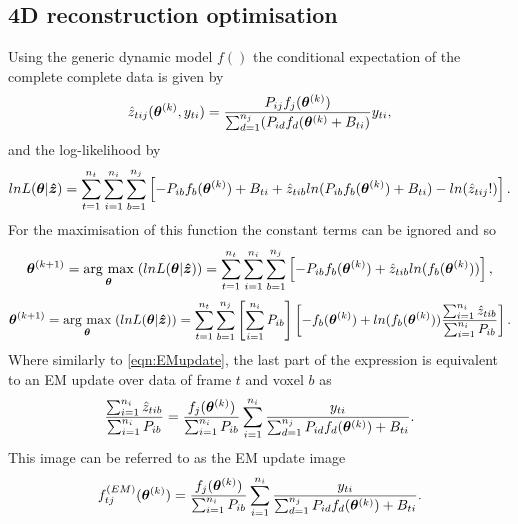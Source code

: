 \subsection{4D reconstruction optimisation}
Using the generic dynamic model $f()$ the conditional expectation of the complete complete data is given by 
\begin{equation}
\hat{z}_{tij}(\bm{\theta}^{(k)},y_{ti}) = 
\frac{P_{ij} f_j(\bm\theta^{(k)})}
{\sum_{d=1}^{n_j} (P_{id} f_d(\bm\theta^{(k)} + B_{ti})}y_{ti}\\,
\end{equation}
and the log-likelihood by
\begin{equation}
lnL(\bm{\theta}|\bm{\hat{z}})  =
\sum_{t=1}^{n_t} \sum_{i=1}^{n_i} \sum_{b=1}^{n_j} 
\left[ -P_{ib} f_b(\bm\theta^{(k)}) + B_{ti} + 
\hat{z}_{tib} ln( P_{ib}  f_b(\bm\theta^{(k)}) + B_{ti} ) -
ln(\hat{z}_{tij}!) \right] \\.
\end{equation}
For the maximisation of this function the constant terms can be ignored and so 
\begin{equation}
\bm{\theta}^{(k+1)} = \underset{\bm{\theta}}{\operatorname{arg}\,\operatorname{max}}\;(lnL(\bm{\theta}|\bm{\hat{z}})) = 
\sum_{t=1}^{n_t} \sum_{i=1}^{n_i} \sum_{b=1}^{n_j} 
\left[ -P_{ib} f_b(\bm\theta^{(k)}) + 
\hat{z}_{tib} ln( f_b(\bm\theta^{(k)})) 
\right] \\, 
\end{equation}
\begin{equation}
\bm{\theta}^{(k+1)} = \underset{\bm{\theta}}{\operatorname{arg}\,\operatorname{max}}\;(lnL(\bm{\theta}|\bm{\hat{z}})) = 
\sum_{t=1}^{n_t} \sum_{b=1}^{n_j} \left[ \sum_{i=1}^{n_i}  P_{ib} \right]
\left[ -f_b(\bm\theta^{(k)}) + 
ln( f_b(\bm\theta^{(k)})) 
\frac{\sum_{i=1}^{n_i} \hat{z}_{tib} }
{ \sum_{i=1}^{n_i}  P_{ib} }
\right] \\ .
\end{equation}
Where similarly to \ref{eqn:EMupdate}, the last part of the expression is equivalent to an EM update over data of frame $t$ and voxel $b$ as 
\begin{equation}
\frac{\sum_{i=1}^{n_i} \hat{z}_{tib} }
{\sum_{i=1}^{n_i}  P_{ib}}  =
\frac{f_j(\bm\theta^{(k)})}{\sum_{i=1}^{n_i}  P_{ib}}
\sum_{i=1}^{n_i} 
\frac{y_{ti}}
{\sum_{d=1}^{n_j} P_{id} f_d(\bm\theta^{(k)}) + B_{ti}}\\.
\end{equation}
This image can be referred to as the EM update image 
\begin{equation}
f_{tj}^{(EM)}(\bm{\theta}^{(k)}) = 
\frac{f_j(\bm\theta^{(k)})}{\sum_{i=1}^{n_i}  P_{ib}}
\sum_{i=1}^{n_i} 
\frac{y_{ti}}
{\sum_{d=1}^{n_j} P_{id} f_d(\bm\theta^{(k)}) + B_{ti}}\\.
\label{eqn:EM_Update_image}
\end{equation}

